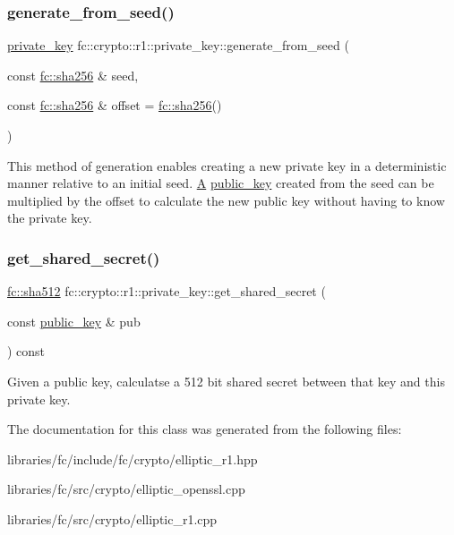 \subsubsection{\texorpdfstring{generate\+\_\+from\+\_\+seed()}{generate\_from\_seed()}}
{\footnotesize\ttfamily \mbox{\hyperlink{classfc_1_1crypto_1_1r1_1_1private__key}{private\+\_\+key}} fc\+::crypto\+::r1\+::private\+\_\+key\+::generate\+\_\+from\+\_\+seed (\begin{DoxyParamCaption}\item[{const \mbox{\hyperlink{classfc_1_1sha256}{fc\+::sha256}} \&}]{seed,  }\item[{const \mbox{\hyperlink{classfc_1_1sha256}{fc\+::sha256}} \&}]{offset = {\ttfamily \mbox{\hyperlink{classfc_1_1sha256}{fc\+::sha256}}()} }\end{DoxyParamCaption})\hspace{0.3cm}{\ttfamily [static]}}

This method of generation enables creating a new private key in a deterministic manner relative to an initial seed. \mbox{\hyperlink{struct_a}{A}} \mbox{\hyperlink{classfc_1_1crypto_1_1r1_1_1public__key}{public\+\_\+key}} created from the seed can be multiplied by the offset to calculate the new public key without having to know the private key. \mbox{\label{classfc_1_1crypto_1_1r1_1_1private__key_a9a312037162a8f847825f0387d9aa59e}} 
\subsubsection{\texorpdfstring{get\+\_\+shared\+\_\+secret()}{get\_shared\_secret()}}
{\footnotesize\ttfamily \mbox{\hyperlink{classfc_1_1sha512}{fc\+::sha512}} fc\+::crypto\+::r1\+::private\+\_\+key\+::get\+\_\+shared\+\_\+secret (\begin{DoxyParamCaption}\item[{const \mbox{\hyperlink{classfc_1_1crypto_1_1r1_1_1public__key}{public\+\_\+key}} \&}]{pub }\end{DoxyParamCaption}) const}

Given a public key, calculatse a 512 bit shared secret between that key and this private key. 

The documentation for this class was generated from the following files\+:\begin{DoxyCompactItemize}
\item 
libraries/fc/include/fc/crypto/elliptic\+\_\+r1.\+hpp\item 
libraries/fc/src/crypto/elliptic\+\_\+openssl.\+cpp\item 
libraries/fc/src/crypto/elliptic\+\_\+r1.\+cpp\end{DoxyCompactItemize}
